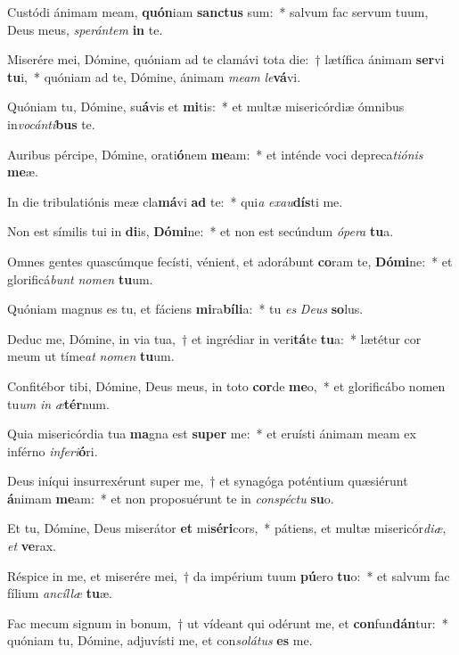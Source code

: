 \item Custódi ánimam meam, \textbf{quón}iam \textbf{sanc}\textbf{tus} sum:~* salvum fac servum tuum, Deus meus, \textit{spe}\textit{rán}\textit{tem} \textbf{in} te.
\item Miserére mei, Dómine, quóniam ad te clamávi tota die:~† lætífica ánimam \textbf{ser}vi \textbf{tu}i,~* quóniam ad te, Dómine, ánimam \textit{me}\textit{am} \textit{le}\textbf{vá}vi.
\item Quóniam tu, Dómine, su\textbf{á}vis et \textbf{mi}tis:~* et multæ misericórdiæ ómnibus in\textit{vo}\textit{cán}\textit{ti}\textbf{bus} te.
\item Auribus pércipe, Dómine, orati\textbf{ó}nem \textbf{me}am:~* et inténde voci depreca\textit{ti}\textit{ó}\textit{nis} \textbf{me}æ.
\item In die tribulatiónis meæ cla\textbf{má}vi \textbf{ad} te:~* qui\textit{a} \textit{ex}\textit{au}\textbf{dís}ti me.
\item Non est símilis tui in \textbf{di}is, \textbf{Dó}\textbf{mi}ne:~* et non est secúndum \textit{ó}\textit{pe}\textit{ra} \textbf{tu}a.
\item Omnes gentes quascúmque fecísti, vénient, et adorábunt \textbf{co}ram te, \textbf{Dó}\textbf{mi}ne:~* et glorificá\textit{bunt} \textit{no}\textit{men} \textbf{tu}um.
\item Quóniam magnus es tu, et fáciens \textbf{mi}ra\textbf{bí}\textbf{li}a:~* tu \textit{es} \textit{De}\textit{us} \textbf{so}lus.
\item Deduc me, Dómine, in via tua,~† et ingrédiar in veri\textbf{tá}te \textbf{tu}a:~* lætétur cor meum ut tíme\textit{at} \textit{no}\textit{men} \textbf{tu}um.
\item Confitébor tibi, Dómine, Deus meus, in toto \textbf{cor}de \textbf{me}o,~* et glorificábo nomen tu\textit{um} \textit{in} \textit{æ}\textbf{tér}num.
\item Quia misericórdia tua \textbf{ma}gna est \textbf{su}\textbf{per} me:~* et eruísti ánimam meam ex inférno \textit{in}\textit{fe}\textit{ri}\textbf{ó}ri.
\item Deus iníqui insurrexérunt super me,~† et synagóga poténtium quæsiérunt \textbf{á}nimam \textbf{me}am:~* et non proposuérunt te in \textit{con}\textit{spéc}\textit{tu} \textbf{su}o.
\item Et tu, Dómine, Deus miserátor \textbf{et} mi\textbf{sé}\textbf{ri}cors,~* pátiens, et multæ misericór\textit{di}\textit{æ}, \textit{et} \textbf{ve}rax.
\item Réspice in me, et miserére mei,~† da impérium tuum \textbf{pú}ero \textbf{tu}o:~* et salvum fac fílium \textit{an}\textit{cíl}\textit{læ} \textbf{tu}æ.
\item Fac mecum signum in bonum,~† ut vídeant qui odérunt me, et \textbf{con}fun\textbf{dán}tur:~* quóniam tu, Dómine, adjuvísti me, et con\textit{so}\textit{lá}\textit{tus} \textbf{es} me.
